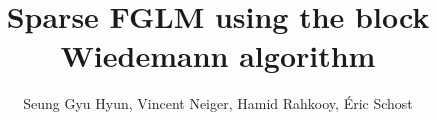 \documentclass[final]{beamer}
\title{Sparse FGLM using the block Wiedemann algorithm} %
\author{Seung Gyu Hyun, Vincent Neiger, Hamid Rahkooy, \'Eric Schost} %
\institute{University of Waterloo, DTU Compute} %
\newlength{\sepwid}
\newlength{\onecolwid}
\begin{document}

\setlength{\belowcaptionskip}{2ex} %
\setlength\belowdisplayshortskip{2ex} %

\begin{frame}[t] %

\begin{columns}[t] %

\begin{column}{\sepwid}\end{column} %

\begin{column}{\onecolwid} %







\end{column}
\end{columns}
\end{frame}
\end{document}
